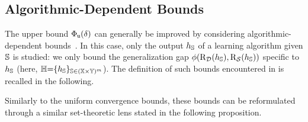 \subsection{Algorithmic-Dependent Bounds}

The upper bound $\PhiUC(\delta)$ can generally be improved by considering algorithmic-dependent bounds~\citep{BousquetElisseeff2002, XuMannor2012}.
In this case, only the output $\h_{\S}$ of a learning algorithm given $\S$ is studied: we only bound the generalization gap $\phi(\Risk_{\D}(\h_{\S}), \Risk_{\dS}(\h_{\S}))$ specific to $\h_{\S}$ (here,  $\H{=}\{\h_{\S}\}_{\S\in(\X{\times}\Y)^\m}$).
The definition of such bounds encountered in  is recalled in the following.


Similarly to the uniform convergence bounds, these bounds can be reformulated through a similar set-theoretic lens stated in the following proposition.

